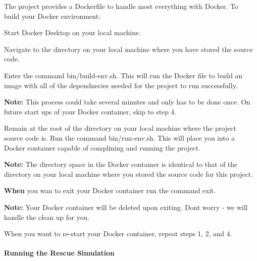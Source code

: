 The project provides a Dockerfile to handle most everything with Docker. To build your Docker environment\+:
\begin{DoxyEnumerate}
\item Start Docker Desktop on your local machine.
\item Navigate to the directory on your local machine where you have stored the source code.
\item Enter the command {\ttfamily bin/build-\/env.\+sh}. This will run the Docker file to build an image with all of the dependnecies needed for the project to run successfully.
\begin{DoxyEnumerate}
\item {\bfseries Note\+:} This process could take several minutes and only has to be done once. On future start ups of your Docker container, skip to step 4.
\end{DoxyEnumerate}
\item Remain at the root of the directory on your local machine where the project source code is. Run the command {\ttfamily bin/run-\/env.\+sh}. This will place you into a Docker container capable of complining and running the project.
\begin{DoxyEnumerate}
\item {\bfseries Note\+:} The directory space in the Docker container is identical to that of the directory on your local machine where you stored the source code for this project.
\end{DoxyEnumerate}
\item {\bfseries When} you wan to exit your Docker container run the command {\ttfamily exit}.
\begin{DoxyEnumerate}
\item {\bfseries Note\+:} Your Docker container will be deleted upon exiting. Don\textquotesingle{}t worry -\/ we will handle the clean up for you.
\end{DoxyEnumerate}
\item When you want to re-\/start your Docker container, repeat steps 1, 2, and 4.
\end{DoxyEnumerate}

\paragraph*{Running the Rescue Simulation}


